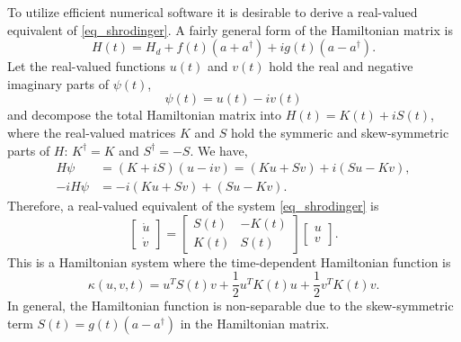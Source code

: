 \documentclass[11pt]{article}
\begin{document}
To utilize efficient numerical software it is desirable to derive a real-valued equivalent of
\eqref{eq_shrodinger}. A fairly general form of the Hamiltonian matrix is
\[
H(t) = H_d + f(t)(a+a^\dag) + i g(t)(a-a^\dag).
\]
Let the real-valued functions $u(t)$ and $v(t)$ hold the real and negative imaginary parts of $\psi(t)$,
\[
\psi(t) = u(t) - iv(t)
\]
and decompose the total Hamiltonian matrix into $H(t) = K(t) + i S(t)$, where the real-valued
matrices $K$ and $S$ hold the symmeric and skew-symmetric parts of $H$: $K^\dag = K$ and $S^\dag =
-S$. We have,
\begin{align*}
H\psi &= (K+iS)(u - iv) = (Ku + Sv) + i(Su - Kv),\\
-iH\psi &= -i(Ku + Sv) + (Su - Kv).
\end{align*}
Therefore, a real-valued equivalent of the system \eqref{eq_shrodinger} is
\begin{equation}\label{eq_real-shrodinger}
  \begin{bmatrix} \dot{u}\\ \dot{v} \end{bmatrix} =
%
  \begin{bmatrix}
    S(t) & -K(t) \\ K(t) & S(t)
  \end{bmatrix}     
  \begin{bmatrix} u\\ v \end{bmatrix} .
\end{equation}
This is a Hamiltonian system where the time-dependent Hamiltonian function is
\begin{equation}\label{eq_hamiltonian}
\kappa(u,v,t) = u^T S(t) v + \frac{1}{2} u^T K(t) u + \frac{1}{2} v^T K(t) v.
\end{equation}
In general, the Hamiltonian function is non-separable due to the skew-symmetric term
$S(t) =g(t) ( a- a^\dag)$ in the Hamiltonian matrix.
\end{document}
